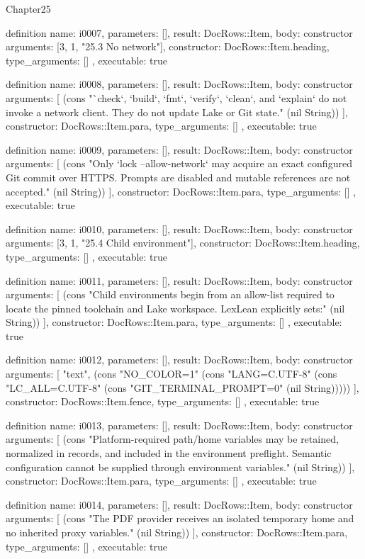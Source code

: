 \begin{lexlean}{Chapter25}
\begin{semanticmodule}
definition{
  name: i0007,
  parameters: [],
  result: DocRows::Item,
  body: constructor{
    arguments: [3, 1, "25.3 No network"],
    constructor: DocRows::Item.heading,
    type_arguments: []
  },
  executable: true
}

definition{
  name: i0008,
  parameters: [],
  result: DocRows::Item,
  body: constructor{
    arguments: [
      (cons "`check`, `build`, `fmt`, `verify`, `clean`, and `explain` do not invoke a network client. They do not update Lake or Git state." (nil String))
    ],
    constructor: DocRows::Item.para,
    type_arguments: []
  },
  executable: true
}

definition{
  name: i0009,
  parameters: [],
  result: DocRows::Item,
  body: constructor{
    arguments: [
      (cons "Only `lock --allow-network` may acquire an exact configured Git commit over HTTPS. Prompts are disabled and mutable references are not accepted." (nil String))
    ],
    constructor: DocRows::Item.para,
    type_arguments: []
  },
  executable: true
}

definition{
  name: i0010,
  parameters: [],
  result: DocRows::Item,
  body: constructor{
    arguments: [3, 1, "25.4 Child environment"],
    constructor: DocRows::Item.heading,
    type_arguments: []
  },
  executable: true
}

definition{
  name: i0011,
  parameters: [],
  result: DocRows::Item,
  body: constructor{
    arguments: [
      (cons "Child environments begin from an allow-list required to locate the pinned toolchain and Lake workspace. LexLean explicitly sets:" (nil String))
    ],
    constructor: DocRows::Item.para,
    type_arguments: []
  },
  executable: true
}

definition{
  name: i0012,
  parameters: [],
  result: DocRows::Item,
  body: constructor{
    arguments: [
      "text",
      (cons "NO_COLOR=1" (cons "LANG=C.UTF-8" (cons "LC_ALL=C.UTF-8" (cons "GIT_TERMINAL_PROMPT=0" (nil String)))))
    ],
    constructor: DocRows::Item.fence,
    type_arguments: []
  },
  executable: true
}

definition{
  name: i0013,
  parameters: [],
  result: DocRows::Item,
  body: constructor{
    arguments: [
      (cons "Platform-required path/home variables may be retained, normalized in records, and included in the environment preflight. Semantic configuration cannot be supplied through environment variables." (nil String))
    ],
    constructor: DocRows::Item.para,
    type_arguments: []
  },
  executable: true
}

definition{
  name: i0014,
  parameters: [],
  result: DocRows::Item,
  body: constructor{
    arguments: [
      (cons "The PDF provider receives an isolated temporary home and no inherited proxy variables." (nil String))
    ],
    constructor: DocRows::Item.para,
    type_arguments: []
  },
  executable: true
}


\end{semanticmodule}
\end{lexlean}
